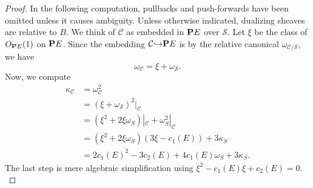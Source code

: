 \documentclass{amsart}
\renewcommand {\P}{{\bf P}}
\newcommand{\into}{{\hookrightarrow}}
\newcommand{\orb}[1]{{\mathcal #1}}     %
\begin{document}
\begin{proof}
  In the following computation, pullbacks and push-forwards have been   omitted unless it causes ambiguity. Unless otherwise indicated, dualizing sheaves are relative to $B$. We think of $\orb C$ as embedded in $\P E$ over $\orb S$. Let $\xi$ be the class of $O_{\P   E}(1)$ on $\P E$. Since the embedding $\orb C \into \P E$ is by the relative canonical $\omega_{\orb C/\orb S}$, we have
\[ \omega_{\orb C} = \xi + \omega_{\orb S}.\]
Now, we compute
\begin{align*}
  \kappa_{\orb C} &= \omega_{\orb C}^2 \\
  &= (\xi + \omega_{\orb S})^2|_{\orb C} \\
  &= (\xi^2 + 2\xi\omega_S)|_{\orb C} + \omega_S^2|_{\orb C} \\
  &= (\xi^2 + 2\xi\omega_S)(3\xi-c_1(E)) + 3 \kappa_S\\
  &= 2c_1(E)^2 - 3c_2(E) + 4c_1(E)\omega_S + 3 \kappa_S.
\end{align*}
The last step is mere algebraic simplification using $\xi^2 - c_1(E) \xi + c_2(E) = 0.$


\end{proof}
\end{document}
